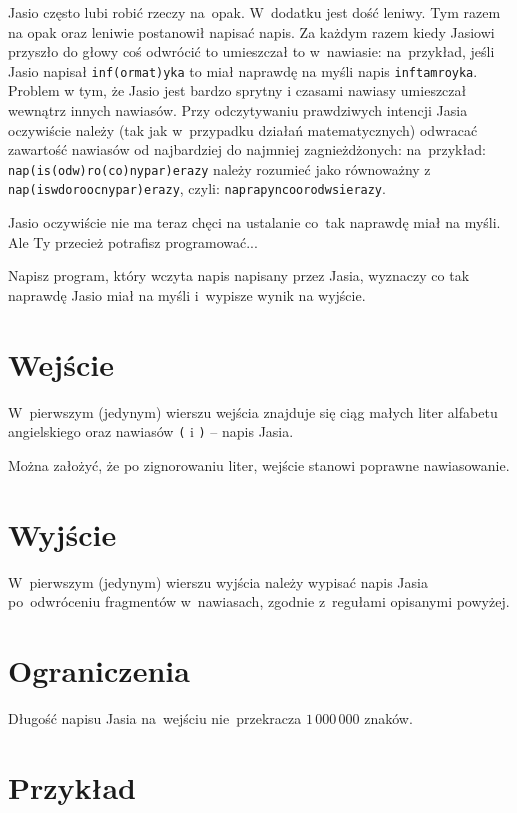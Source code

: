 \documentclass{solve}
\begin{document}

  Jasio często lubi robić rzeczy na~opak. W~dodatku jest dość leniwy. Tym razem
  na opak oraz leniwie postanowił napisać napis. Za każdym razem kiedy Jasiowi
  przyszło do głowy coś odwrócić to umieszczał to w~nawiasie: na~przykład, jeśli
  Jasio napisał \texttt{inf(ormat)yka} to miał naprawdę na myśli napis
  \texttt{inftamroyka}. Problem w tym, że Jasio jest bardzo sprytny i czasami
  nawiasy umieszczał wewnątrz innych nawiasów. Przy odczytywaniu prawdziwych
  intencji Jasia oczywiście należy (tak jak w~przypadku działań matematycznych)
  odwracać zawartość nawiasów od najbardziej do najmniej zagnieżdżonych:
  na~przykład: \texttt{nap(is(odw)ro(co)nypar)erazy} należy rozumieć jako
  równoważny z \texttt{nap(iswdoroocnypar)erazy}, czyli:
  \texttt{naprapyncoorodwsierazy}.

  Jasio oczywiście nie ma teraz chęci na ustalanie co~tak naprawdę miał
  na myśli. Ale Ty przecież potrafisz programować...

  Napisz program, który wczyta napis napisany przez Jasia, wyznaczy co tak
  naprawdę Jasio miał na myśli i~wypisze wynik na wyjście.

	\section{Wejście}
  W~pierwszym (jedynym) wierszu wejścia znajduje się ciąg małych liter alfabetu
  angielskiego oraz nawiasów \texttt{(} i \texttt{)} -- napis Jasia.

  Można założyć, że po zignorowaniu liter, wejście stanowi poprawne
  nawiasowanie.

	\section{Wyjście}
  W~pierwszym (jedynym) wierszu wyjścia należy wypisać napis Jasia po~odwróceniu
  fragmentów w~nawiasach, zgodnie z~regułami opisanymi powyżej.

	\section{Ograniczenia}
  Długość napisu Jasia na~wejściu nie~przekracza $1\,000\,000$ znaków.

	\section{Przykład}
\end{document}
